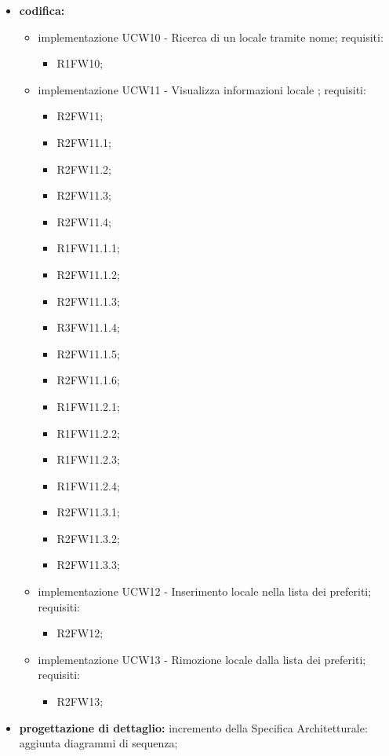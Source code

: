 \begin{itemize}
	\item \textbf{codifica:} 
			\begin{itemize}
				\item implementazione UCW10 - Ricerca di un locale tramite nome; requisiti:
					\begin{itemize}
						\item R1FW10;
					\end{itemize}
				\item implementazione UCW11 - Visualizza informazioni locale ; requisiti:
					\begin{itemize}
						\item R2FW11;
						\item R2FW11.1;
						\item R2FW11.2;
						\item R2FW11.3;
						\item R2FW11.4;
      					\item R1FW11.1.1;
           				\item R2FW11.1.2;
               			\item R2FW11.1.3;
                  		\item R3FW11.1.4;
                   		\item R2FW11.1.5;
						\item R2FW11.1.6;
						\item R1FW11.2.1;
						\item R1FW11.2.2;
						\item R1FW11.2.3;
						\item R1FW11.2.4;
						\item R2FW11.3.1;
						\item R2FW11.3.2;
						\item R2FW11.3.3;
					\end{itemize}
				\item implementazione UCW12 - Inserimento locale nella lista dei preferiti; requisiti:
					\begin{itemize}
						\item R2FW12;
					\end{itemize}
				\item implementazione UCW13 - Rimozione locale dalla lista dei preferiti; requisiti:
					\begin{itemize}
						\item R2FW13;
					\end{itemize}
			\end{itemize}
	\item \textbf{progettazione di dettaglio:} incremento della Specifica Architetturale: aggiunta diagrammi di sequenza;

\end{itemize}
